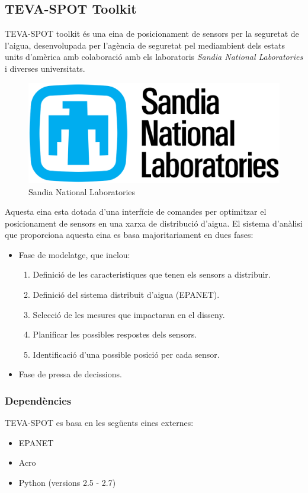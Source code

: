 \documentclass[12pt]{article}
\begin{document}
\subsection{TEVA-SPOT Toolkit}
TEVA-SPOT toolkit és una eina de posicionament de sensors per la seguretat de l'aigua, desenvolupada per l'agència de seguretat pel mediambient dels estats units d'amèrica amb colaboració amb els laboratoris \textit{Sandia National Laboratories} i diverses universitats.

\begin{figure}[h!]
	\centering
	\includegraphics[scale=0.3]{imatges/snlabs.png}
	\caption{Sandia National Laboratories}
\end{figure}

Aquesta eina esta dotada d'una interfície de comandes per optimitzar el posicionament de sensors en una xarxa de distribució d'aigua. El sistema d'anàlisi que proporciona aquesta eina es basa majoritariament en dues fases:
\begin{itemize}
	\item Fase de modelatge, que inclou:
	\begin{enumerate}
		\item Definició de les caracteristiques que tenen els sensors a distribuir.
		\item Definició del sistema distribuit d'aigua (EPANET).
		\item Selecció de les mesures que impactaran en el disseny.
		\item Planificar les possibles respostes dels sensors.
		\item Identificació d'una possible posició per cada sensor.
	\end{enumerate}
	\item Fase de pressa de decissions.
\end{itemize}

\subsubsection{Dependències}
TEVA-SPOT es basa en les següents eines externes:
\begin{itemize}
	\item EPANET
	\item Acro
	\item Python (versions 2.5 - 2.7)
\end{itemize}
\end{document}
